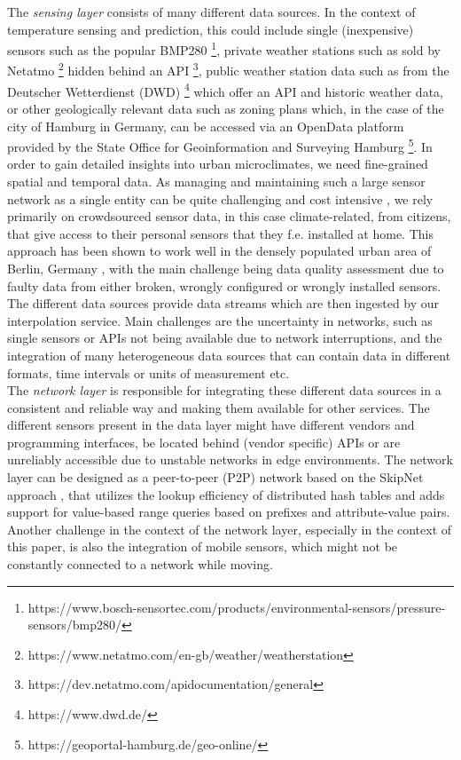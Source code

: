 The \textit{sensing layer} consists of many different data sources. In the context of temperature sensing and prediction, this could include single (inexpensive) sensors such as the popular BMP280 \footnote{https://www.bosch-sensortec.com/products/environmental-sensors/pressure-sensors/bmp280/}, private weather stations such as sold by Netatmo \footnote{https://www.netatmo.com/en-gb/weather/weatherstation} hidden behind an API \footnote{https://dev.netatmo.com/apidocumentation/general}, public weather station data such as from the Deutscher Wetterdienst (DWD) \footnote{https://www.dwd.de/} which offer an API and historic weather data, or other geologically relevant data such as zoning plans which, in the case of the city of Hamburg in Germany, can be accessed via an OpenData platform provided by the State Office for Geoinformation and Surveying Hamburg \footnote{https://geoportal-hamburg.de/geo-online/}. In order to gain detailed insights into urban microclimates, we need fine-grained spatial and temporal data. As managing and maintaining such a large sensor network as a single entity can be quite challenging and cost intensive \cite{chapman2015birmingham}, we rely primarily on crowdsourced sensor data, in this case climate-related, from citizens, that give access to their personal sensors that they f.e. installed at home. This approach has been shown to work well in the densely populated urban area of Berlin, Germany \cite{meier2017crowdsourcing}, with the main challenge being data quality assessment due to faulty data from either broken, wrongly configured or wrongly installed sensors. The different data sources provide data streams which are then ingested by our interpolation service. Main challenges are the uncertainty in networks, such as single sensors or APIs not being available due to network interruptions, and the integration of many heterogeneous data sources that can contain data in different formats, time intervals or units of measurement etc.\\
The \textit{network layer} is responsible for integrating these different data sources in a consistent and reliable way and making them available for other services. The different sensors present in the data layer might have different vendors and programming interfaces, be located behind (vendor specific) APIs or are unreliably accessible due to unstable networks in edge environments. The network layer can be designed as a peer-to-peer (P2P) network based on the SkipNet approach \cite{harvey2002skipnet}, that utilizes the lookup efficiency of distributed hash tables and adds support for value-based range queries based on prefixes and attribute-value pairs. Another challenge in the context of the network layer, especially in the context of this paper, is also the integration of mobile sensors, which might not be constantly connected to a network while moving.\\
